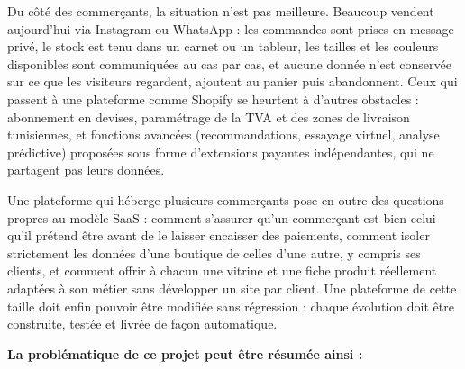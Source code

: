 \vspace{6pt}
Du côté des commerçants, la situation n'est pas meilleure. Beaucoup vendent aujourd'hui via Instagram ou WhatsApp : les commandes sont prises en message privé, le stock est tenu dans un carnet ou un tableur, les tailles et les couleurs disponibles sont communiquées au cas par cas, et aucune donnée n'est conservée sur ce que les visiteurs regardent, ajoutent au panier puis abandonnent. Ceux qui passent à une plateforme comme Shopify se heurtent à d'autres obstacles : abonnement en devises, paramétrage de la TVA et des zones de livraison tunisiennes, et fonctions avancées (recommandations, essayage virtuel, analyse prédictive) proposées sous forme d'extensions payantes indépendantes, qui ne partagent pas leurs données.\newline

\vspace{6pt}
Une plateforme qui héberge plusieurs commerçants pose en outre des questions propres au modèle SaaS : comment s'assurer qu'un commerçant est bien celui qu'il prétend être avant de le laisser encaisser des paiements, comment isoler strictement les données d'une boutique de celles d'une autre, y compris ses clients, et comment offrir à chacun une vitrine et une fiche produit réellement adaptées à son métier sans développer un site par client. Une plateforme de cette taille doit enfin pouvoir être modifiée sans régression : chaque évolution doit être construite, testée et livrée de façon automatique.\newline

\vspace{6pt}
\textbf{La problématique de ce projet peut être résumée ainsi :}
\vspace{6pt}
\begin{center}
\end{center}
\vspace{6pt}

